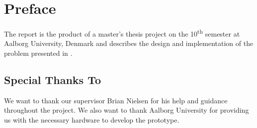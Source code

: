 \section*{Preface}\label{sec:preface}
The report is the product of a master's thesis project on the 10\textsuperscript{th} semester at Aalborg University, Denmark and describes the design and implementation of the problem presented in .

\subsection*{Special Thanks To}
We want to thank our supervisor Brian Nielsen for his help and guidance throughout the project. We also want to thank Aalborg University for providing us with the necessary hardware to develop the prototype.

